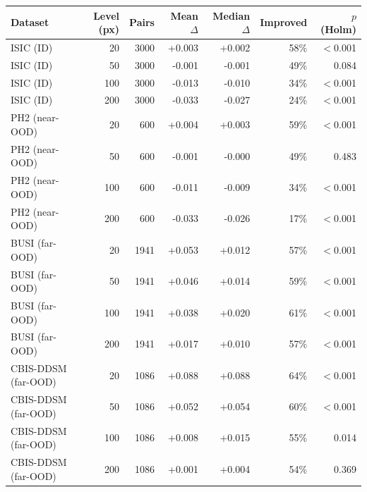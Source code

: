 \begin{tabular}{lrrrrrr}
\toprule
Dataset & Level (px) & Pairs & Mean $\Delta$ & Median $\Delta$ & Improved & $p$ (Holm) \\
\midrule
ISIC (ID) & 20 & 3000 & +0.003 & +0.002 & 58\% & $<$0.001 \\
ISIC (ID) & 50 & 3000 & -0.001 & -0.001 & 49\% & 0.084 \\
ISIC (ID) & 100 & 3000 & -0.013 & -0.010 & 34\% & $<$0.001 \\
ISIC (ID) & 200 & 3000 & -0.033 & -0.027 & 24\% & $<$0.001 \\
PH2 (near-OOD) & 20 & 600 & +0.004 & +0.003 & 59\% & $<$0.001 \\
PH2 (near-OOD) & 50 & 600 & -0.001 & -0.000 & 49\% & 0.483 \\
PH2 (near-OOD) & 100 & 600 & -0.011 & -0.009 & 34\% & $<$0.001 \\
PH2 (near-OOD) & 200 & 600 & -0.033 & -0.026 & 17\% & $<$0.001 \\
BUSI (far-OOD) & 20 & 1941 & +0.053 & +0.012 & 57\% & $<$0.001 \\
BUSI (far-OOD) & 50 & 1941 & +0.046 & +0.014 & 59\% & $<$0.001 \\
BUSI (far-OOD) & 100 & 1941 & +0.038 & +0.020 & 61\% & $<$0.001 \\
BUSI (far-OOD) & 200 & 1941 & +0.017 & +0.010 & 57\% & $<$0.001 \\
CBIS-DDSM (far-OOD) & 20 & 1086 & +0.088 & +0.088 & 64\% & $<$0.001 \\
CBIS-DDSM (far-OOD) & 50 & 1086 & +0.052 & +0.054 & 60\% & $<$0.001 \\
CBIS-DDSM (far-OOD) & 100 & 1086 & +0.008 & +0.015 & 55\% & 0.014 \\
CBIS-DDSM (far-OOD) & 200 & 1086 & +0.001 & +0.004 & 54\% & 0.369 \\
\bottomrule
\end{tabular}
